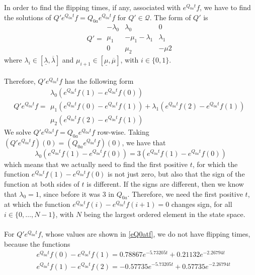 \documentclass{article}
\begin{document}
In order to find the flipping times, if any, associated with $e^{Q_{0a}t}f$, we have to find the solutions of $Q'e^{Q_{0a}t}f=Q_{0a}e^{Q_{0a}t}f$ for $Q'\in\mathcal{Q}$.
The form of $Q'$ is
\begin{equation*} 
 Q'= 
 \begin{array}{|ccc|}
  -\lambda_{0} & \lambda_{0} & 0 \\
  \mu_{1} & -\mu_{1}-\lambda_{1} & \lambda_{1}  \\
  0 & \mu_{2} & -\mu{2}  
 \end{array}
 \end{equation*}
 where $\lambda_{i}\in[\underline{\lambda},\overline{\lambda}]$ and $\mu_{i+1}\in[\underline{\mu},\overline{\mu}]$, with $i\in\{0,1\}$.\\\\
 Therefore, $Q'e^{Q_{0a}t}f$ has the following form
 \begin{equation*} 
 Q'e^{Q_{0a}t}f= 
 \begin{array}{|c|}
  \lambda_{0}(e^{Q_{0a}t}f(1)-e^{Q_{0a}t}f(0))\\
  \mu_{1}(e^{Q_{0a}t}f(0)-e^{Q_{0a}t}f(1))+\lambda_{1}(e^{Q_{0a}t}f(2)-e^{Q_{0a}t}f(1))\\
  \mu_{2}(e^{Q_{0a}t}f(2)-e^{Q_{0a}t}f(1))  
 \end{array}
 \end{equation*}
We solve $Q'e^{Q_{0a}t}f=Q_{0a}e^{Q_{0a}t}f$ row-wise.
Taking $(Q'e^{Q_{0a}t}f)(0)=(Q_{0a}e^{Q_{0a}t}f)(0)$, we have that
\begin{equation*} 
\lambda_{0}(e^{Q_{0a}t}f(1)-e^{Q_{0a}t}f(0))=3(e^{Q_{0a}t}f(1)-e^{Q_{0a}t}f(0))
 \end{equation*}
which means that we actually need to find the first positive $t$, for which the function $e^{Q_{0a}t}f(1)-e^{Q_{0a}t}f(0)$ is not just zero, but also that the sign of the function at both sides of $t$ is different.
If the signs are different, then we know that $\lambda_{0}=1$, since before it was 3 in $Q_{0a}$.
Therefore, we need the first positive $t$, at which the function $e^{Q_{0a}t}f(i)-e^{Q_{0a}t}f(i+1)=0$ changes sign, for all $i\in\{0,\ldots,N-1\}$, with $N$ being the largest ordered element in the state space.\\\\
For $Q'e^{Q_{0a}t}f$, whose values are shown in \eqref{eQ0atf}, we do not have flipping times, because the functions
\begin{equation*}
\begin{split}
&e^{Q_{0a}t}f(0)-e^{Q_{0a}t}f(1)= 0.78867e^{-5.73205t}+0.21132e^{-2.26794t}\\
&e^{Q_{0a}t}f(1)-e^{Q_{0a}t}f(2)=-0.57735e^{-5.73205t}+0.57735e^{-2.26794t}
\end{split}
\end{equation*}
\end{document}
